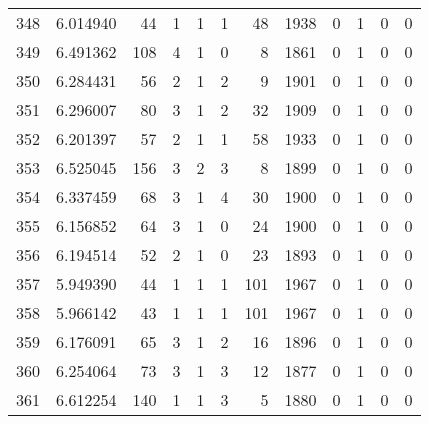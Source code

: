\begin{tabular}{lrrrrrrrrrrr}
348 &  6.014940 &   44 &      1 &        1 &      1 &              48 &  1938 &               0 &               1 &               0 &               0 \\
349 &  6.491362 &  108 &      4 &        1 &      0 &               8 &  1861 &               0 &               1 &               0 &               0 \\
350 &  6.284431 &   56 &      2 &        1 &      2 &               9 &  1901 &               0 &               1 &               0 &               0 \\
351 &  6.296007 &   80 &      3 &        1 &      2 &              32 &  1909 &               0 &               1 &               0 &               0 \\
352 &  6.201397 &   57 &      2 &        1 &      1 &              58 &  1933 &               0 &               1 &               0 &               0 \\
353 &  6.525045 &  156 &      3 &        2 &      3 &               8 &  1899 &               0 &               1 &               0 &               0 \\
354 &  6.337459 &   68 &      3 &        1 &      4 &              30 &  1900 &               0 &               1 &               0 &               0 \\
355 &  6.156852 &   64 &      3 &        1 &      0 &              24 &  1900 &               0 &               1 &               0 &               0 \\
356 &  6.194514 &   52 &      2 &        1 &      0 &              23 &  1893 &               0 &               1 &               0 &               0 \\
357 &  5.949390 &   44 &      1 &        1 &      1 &             101 &  1967 &               0 &               1 &               0 &               0 \\
358 &  5.966142 &   43 &      1 &        1 &      1 &             101 &  1967 &               0 &               1 &               0 &               0 \\
359 &  6.176091 &   65 &      3 &        1 &      2 &              16 &  1896 &               0 &               1 &               0 &               0 \\
360 &  6.254064 &   73 &      3 &        1 &      3 &              12 &  1877 &               0 &               1 &               0 &               0 \\
361 &  6.612254 &  140 &      1 &        1 &      3 &               5 &  1880 &               0 &               1 &               0 &               0 \\

\end{tabular}
